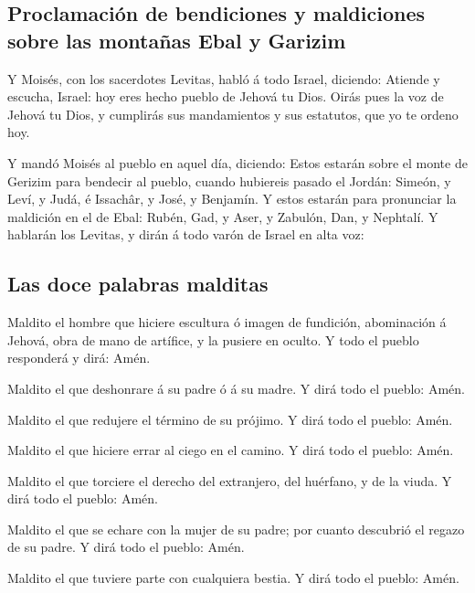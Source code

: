\hypertarget{proclamaciuxf3n-de-bendiciones-y-maldiciones-sobre-las-montauxf1as-ebal-y-garizim}{%
\subsection{Proclamación de bendiciones y maldiciones sobre las montañas
Ebal y
Garizim}\label{proclamaciuxf3n-de-bendiciones-y-maldiciones-sobre-las-montauxf1as-ebal-y-garizim}}

 Y Moisés, con los sacerdotes Levitas, habló á todo
Israel, diciendo: Atiende y escucha, Israel: hoy eres hecho pueblo de
Jehová tu Dios.  Oirás pues la voz de Jehová tu Dios, y
cumplirás sus mandamientos y sus estatutos, que yo te ordeno hoy.

 Y mandó Moisés al pueblo en aquel día, diciendo:
 Estos estarán sobre el monte de Gerizim para bendecir al
pueblo, cuando hubiereis pasado el Jordán: Simeón, y Leví, y Judá, é
Issachâr, y José, y Benjamín.  Y estos estarán para
pronunciar la maldición en el de Ebal: Rubén, Gad, y Aser, y Zabulón,
Dan, y Nephtalí.  Y hablarán los Levitas, y dirán á todo
varón de Israel en alta voz:

\hypertarget{las-doce-palabras-malditas}{%
\subsection{Las doce palabras
malditas}\label{las-doce-palabras-malditas}}

 Maldito el hombre que hiciere escultura ó imagen de
fundición, abominación á Jehová, obra de mano de artífice, y la pusiere
en oculto. Y todo el pueblo responderá y dirá: Amén.

 Maldito el que deshonrare á su padre ó á su madre. Y
dirá todo el pueblo: Amén.

 Maldito el que redujere el término de su prójimo. Y dirá
todo el pueblo: Amén.

 Maldito el que hiciere errar al ciego en el camino. Y
dirá todo el pueblo: Amén.

 Maldito el que torciere el derecho del extranjero, del
huérfano, y de la viuda. Y dirá todo el pueblo: Amén.

 Maldito el que se echare con la mujer de su padre; por
cuanto descubrió el regazo de su padre. Y dirá todo el pueblo: Amén.

 Maldito el que tuviere parte con cualquiera bestia. Y
dirá todo el pueblo: Amén.

